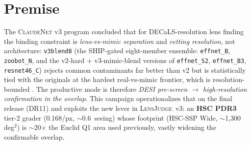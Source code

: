 \documentclass[11pt,letterpaper]{article}
\newcommand{\cnet}{\textsc{ClaudeNet}}
\newcommand{\lj}{\textsc{LensJudge}}
\newcommand{\vb}{\texttt{v3blend8}}
\begin{document}
\begin{abstract}
no HSC-SSP or Euclid~Q1 coverage (App.~\ref{app:resolution}); a literature crosscheck finds \textbf{69
are previously-published lenses} (mostly DES, whose footprint this DECaLS-south region heavily overlaps)
and \textbf{39 are new} (36 grade~B and 3 grade~A). These cannot be validated beyond DECaLS $1\arcsec$
--- an unknown and likely large fraction are lrg+companion mimics --- and the set is residual- and
nondeterminism-sensitive (larger under the honest residual, but hotter rather than more complete), so it
is a follow-up target list, not a catalogue. The honest frame is unchanged from the
v3 program: the model recovers known lenses and ranks new candidates the higher-resolution HSC grader
rates highly, but \emph{no net-new lens is established from DECaLS pixels alone} (the new candidates
depend on HSC resolution and remain unconfirmed),
and net-new discovery beyond existing high-resolution catalogs is resolution-bounded --- the value of
the \emph{resolution lever} (now HSC over $\sim$1{,}300\,deg$^{2}$, far wider than Euclid Q1) is to
\emph{convert} overlap candidates, not to manufacture discoveries. The \textbf{DR11-north} (BASS/MzLS) arm --- which needs instrument-native
retraining (v3 is DECam-specific) --- is fully staged but deferred by a 7-day Perlmutter maintenance.
\end{abstract}

\section{Premise}
The \cnet{} v3 program concluded that for DECaLS-resolution lens finding the binding constraint is
\emph{lens-vs-mimic separation} and \emph{vetting resolution}, not architecture: \vb{} (the SHIP-gated
eight-member ensemble: \texttt{effnet\_B}, \texttt{zoobot\_N}, and the v2-hard $+$ v3-mimic-blend
versions of \texttt{effnet\_S2}, \texttt{effnet\_B3}, \texttt{resnet46\_C}) rejects common contaminants
far better than v2 but is statistically tied with the originals at the hardest real-vs-mimic frontier,
which is resolution-bounded \citep{inchausti2025}. The productive mode is therefore \emph{DESI
pre-screen $\to$ high-resolution confirmation in the overlap}. This campaign operationalizes that on the
final release (DR11) and exploits the new lever in \lj{}~v3: an \textbf{HSC PDR3} tier-2 grader
\citep{aihara2022hscpdr3} (0.168\arcsec/px, $\sim$0.6\arcsec\ seeing) whose footprint (HSC-SSP Wide,
$\sim$1{,}300\,deg$^{2}$) is $\sim$20$\times$ the Euclid Q1 area used previously, vastly widening the
confirmable overlap.
\end{document}
